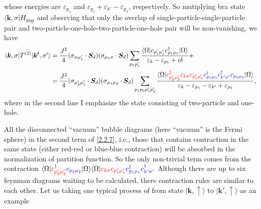 \documentclass[aps,prx,superscriptaddress,onecolumn,preprintnumbers,nofootinbib,longbibliography]{revtex4-1}
\def\imp{\text{imp}}
\begin{document}
		whose energies are $\varepsilon_{p_1}$ and $\varepsilon_{p_1}+\varepsilon_{k'}-\varepsilon_{p_2}$, respectively. So mutiplying bra state $\langle\bm{k},\sigma|H_\imp$ and observing that only the overlap of single-particle-single-particle pair and two-particle-one-hole-two-particle-one-hole pair will be non-vanishing, we have
		\begin{align}
			\langle\bm{k},\sigma|T^{(2)}|\bm{k'},\sigma'\rangle&=\dfrac{J^2}{4}(\sigma_{\sigma\mu_1'}\cdot\bm{S}_d)(\sigma_{\mu_1\sigma}\cdot\bm{S}_d)\sum_{p_1p_1'}\dfrac{\langle\Omega|c_{p_1'\mu_1'}c_{p_1\mu_1}^\dagger|\Omega\rangle}{\varepsilon_k- \varepsilon_{p_1}+i\delta}+\nonumber\\
			&=\dfrac{J^2}{4}(\sigma_{\mu_2'\mu_1'}\cdot\bm{S}_d)(\sigma_{\mu_1\mu_2}\cdot\bm{S}_d)\sum_{p_1p_2p_1'p_2'}\dfrac{\langle\Omega|{\color{red}c_{p_2'\mu_2'}^\dagger c_{k\sigma} c_{p_1'\mu_1'}}{\color{blue}c_{p_1\mu_1}^\dagger c_{k'\sigma'}^\dagger c_{p_2\mu_2}}|\Omega\rangle}{\varepsilon_k- \varepsilon_{p_1}-\varepsilon_{k'}+\varepsilon_{p_2}},\label{2.2.7}
		\end{align}
		where in the second line I emphasize the state consisting of two-particle and one-hole.\par
		All the disconnected ``vacuum'' bubble diagrams (here ``vacuum'' is the Fermi sphere) in the second term of \eqref{2.2.7}, i.e., those that contains contraction in the same state (either red-red or blue-blue contraction) will be absorbed in the normalization of partition function. So the only non-trivial term comes from the contraction $\langle\Omega|{\color{red}c_{p_2'\mu_2'}^\dagger\color{blue}c_{p_2\mu_2}}|\Omega\rangle\langle\Omega|{\color{red}c_{k\sigma} c_{p_1'\mu_1'}}{\color{blue}c_{p_1\mu_1}^\dagger c_{k'\sigma'}^\dagger }$
\fi
		Although there are up to six feynman diagrams waiting to be calculated, there contraction rules are similar to each other. Let us taking one typical process of from state $|\bm{k},\uparrow\rangle$ to $|\bm{k'},\uparrow\rangle$ as an example%
\end{document}
